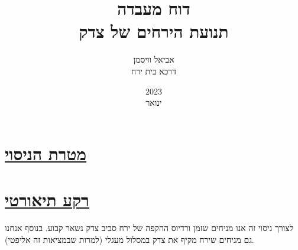 \documentclass[a4paper, 12pt]{article}
\title{דוח מעבדה \\ תנועת הירחים של צדק}
\author{אביאל וויסמן \\ \small{דרכא בית ירח}}
\date{2023 \\ ינואר}
\begin{document}
    
    \maketitle

    \vfill

    {\makeatletter
        \def\@@underline#1{#1}
        \tableofcontents
    \makeatother} %

    \vfill

    \pagebreak %

    \section{\underline{מטרת הניסוי}}
    \begin{flushright}

    \end{flushright}

    \pagebreak %

    \section{\underline{רקע תיאורטי}}

    \begin{flushright}
        לצורך ניסוי זה אנו מניחים שזמן ורדיוס ההקפה של ירח סביב 
        צדק נשאר קבוע.
        בנוסף אנחנו גם מניחים שירח מקיף את צדק במסלול מעגלי (למרות שבמציאות זה אליפטי).
    \end{flushright}
\end{document}
